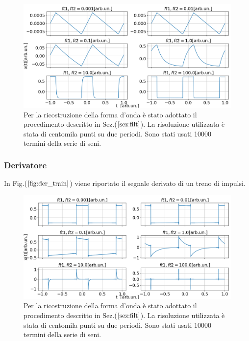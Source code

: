 \documentclass{article}
\begin{document}
                    \begin{figure}[H]
                        \centering
                        \includegraphics[width=1\textwidth]{int_train.png} %
                        \caption{Per la ricostruzione della forma d'onda è stato adottato 
                        il procedimento descritto in Sez.($\ref{sez:filt}$).
                        La risoluzione utilizzata è stata di centomila punti su due periodi.
                        Sono stati usati 10000 termini della serie di seni.}
                        \label{fig:int_train}
                    \end{figure}               

            \subsubsection{Derivatore}
                In Fig.($\ref{fig:der_train}$) viene riportato il segnale derivato di un treno di impulsi.     
                    
                    \begin{figure}[H]
                        \centering
                        \includegraphics[width=1\textwidth]{der_train.png} %
                        \caption{Per la ricostruzione della forma d'onda è stato adottato 
                        il procedimento descritto in Sez.($\ref{sez:filt}$).
                        La risoluzione utilizzata è stata di centomila punti su due periodi.
                        Sono stati usati 10000 termini della serie di seni.}
                        \label{fig:der_train}
                    \end{figure}    
\end{document}
